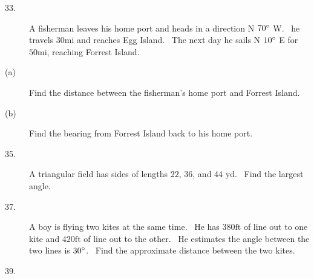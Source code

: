 \begin{description}
\item [33.]
A fisherman leaves his home port and heads in a direction N $70 \mbox{{\ensuremath{{}^\circ}}}$ W. \ he travels $30 \mbox{mi}$ and reaches Egg Island. \ The next day he sails N
$10 \mbox{{\ensuremath{{}^\circ}}}$ E for $50 \mbox{mi}$, reaching Forrest Island. 

\item [(a)]
Find the distance between the fisherman's home port and Forrest Island. 

\item [(b)]
Find the bearing from Forrest Island back to his home port. 

\item [35.]
A triangular field has sides of lengths $22$, $36$, and $44$ yd. \ Find the largest angle. 

\item [37.]
A boy is flying two kites at the same time. \ He has $380 \mbox{ft}$ of line out to one kite and $420 \mbox{ft}$ of line out to the other. \ He estimates the angle
between the two lines is $30 \mbox{{\ensuremath{{}^\circ}}}$. \ Find the approximate distance between the two
kites. 

\item [39.]   
\columnsep =30pt
 \end{description}



